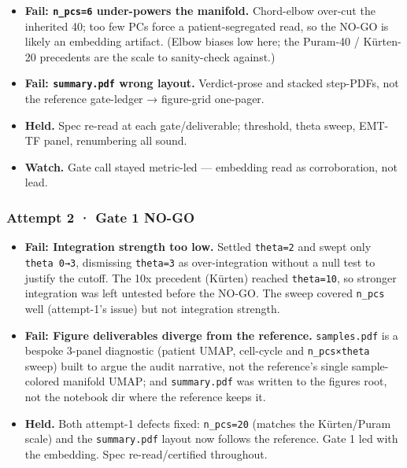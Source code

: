 \documentclass[11pt,a4paper]{article}
\providecommand{\tightlist}{\setlength{\itemsep}{0pt}\setlength{\parskip}{0pt}}
\begin{document}
\begin{itemize}
\tightlist
\item
  \textbf{Fail: \texttt{n\_pcs=6} under-powers the manifold.}
  Chord-elbow over-cut the inherited 40; too few PCs force a
  patient-segregated read, so the NO-GO is likely an embedding artifact.
  (Elbow biases low here; the Puram-40 / Kürten-20 precedents are the
  scale to sanity-check against.)
\item
  \textbf{Fail: \texttt{summary.pdf} wrong layout.} Verdict-prose and stacked step-PDFs, not the reference gate-ledger → figure-grid
  one-pager.
\item
  \textbf{Held.} Spec re-read at each gate/deliverable; threshold, theta
  sweep, EMT-TF panel, renumbering all sound.
\item
  \textbf{Watch.} Gate call stayed metric-led --- embedding read as
  corroboration, not lead.
\end{itemize}

\hypertarget{attempt-2-gate-1-no-go}{%
\subsubsection{Attempt 2 · Gate 1 NO-GO}\label{attempt-2-gate-1-no-go}}

\begin{itemize}
\tightlist
\item
  \textbf{Fail: Integration strength too low.} Settled
  \texttt{theta=2} and swept only \texttt{theta\ 0→3}, dismissing
  \texttt{theta=3} as over-integration without a null test to justify
  the cutoff. The 10x precedent (Kürten) reached \texttt{theta=10}, so
  stronger integration was left untested before the NO-GO. The sweep
  covered \texttt{n\_pcs} well (attempt-1's issue) but not integration
  strength.
\item
  \textbf{Fail: Figure deliverables diverge from the reference.}
  \texttt{samples.pdf} is a bespoke 3-panel diagnostic (patient UMAP, cell-cycle and \texttt{n\_pcs×theta} sweep) built to argue the audit
  narrative, not the reference's single sample-colored manifold UMAP;
  and \texttt{summary.pdf} was written to the figures root, not the
  notebook dir where the reference keeps it.
\item
  \textbf{Held.} Both attempt-1 defects fixed: \texttt{n\_pcs=20}
  (matches the Kürten/Puram scale) and the \texttt{summary.pdf} layout
  now follows the reference. Gate 1 led with the embedding. Spec
  re-read/certified throughout.
\end{itemize}
\end{document}

